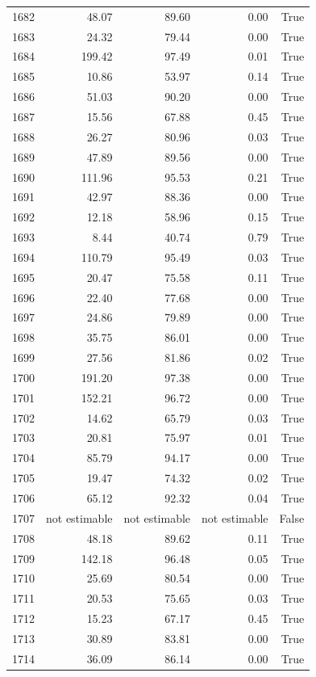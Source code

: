 \begin{longtable}{rrrrr}
1682 & 48.07 & 89.60 & 0.00 & True \\
1683 & 24.32 & 79.44 & 0.00 & True \\
1684 & 199.42 & 97.49 & 0.01 & True \\
1685 & 10.86 & 53.97 & 0.14 & True \\
1686 & 51.03 & 90.20 & 0.00 & True \\
1687 & 15.56 & 67.88 & 0.45 & True \\
1688 & 26.27 & 80.96 & 0.03 & True \\
1689 & 47.89 & 89.56 & 0.00 & True \\
1690 & 111.96 & 95.53 & 0.21 & True \\
1691 & 42.97 & 88.36 & 0.00 & True \\
1692 & 12.18 & 58.96 & 0.15 & True \\
1693 & 8.44 & 40.74 & 0.79 & True \\
1694 & 110.79 & 95.49 & 0.03 & True \\
1695 & 20.47 & 75.58 & 0.11 & True \\
1696 & 22.40 & 77.68 & 0.00 & True \\
1697 & 24.86 & 79.89 & 0.00 & True \\
1698 & 35.75 & 86.01 & 0.00 & True \\
1699 & 27.56 & 81.86 & 0.02 & True \\
1700 & 191.20 & 97.38 & 0.00 & True \\
1701 & 152.21 & 96.72 & 0.00 & True \\
1702 & 14.62 & 65.79 & 0.03 & True \\
1703 & 20.81 & 75.97 & 0.01 & True \\
1704 & 85.79 & 94.17 & 0.00 & True \\
1705 & 19.47 & 74.32 & 0.02 & True \\
1706 & 65.12 & 92.32 & 0.04 & True \\
1707 & not estimable & not estimable & not estimable & False \\
1708 & 48.18 & 89.62 & 0.11 & True \\
1709 & 142.18 & 96.48 & 0.05 & True \\
1710 & 25.69 & 80.54 & 0.00 & True \\
1711 & 20.53 & 75.65 & 0.03 & True \\
1712 & 15.23 & 67.17 & 0.45 & True \\
1713 & 30.89 & 83.81 & 0.00 & True \\
1714 & 36.09 & 86.14 & 0.00 & True \\

\end{longtable}
